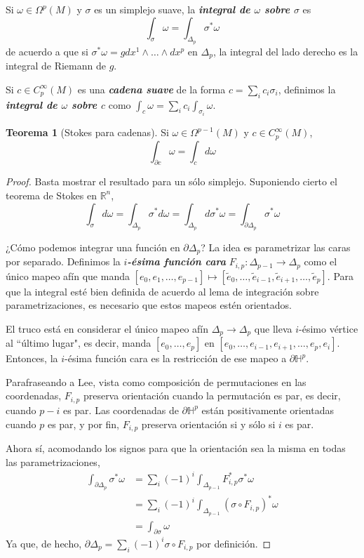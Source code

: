 \documentclass[spanish]{article}
\theoremstyle{definition}
\newtheorem*{teo}{Teorema}
\newcommand{\R}{\mathbb{R}}
\begin{document}
	Si $\omega\in\Omega^p(M)$ y $\sigma$ es un simplejo suave, la \textbf{\textit{integral de $\omega$ sobre $\sigma$}} es
	\[\int_\sigma \omega=\int_{\Delta_p}\sigma^*\omega\]
	de acuerdo a que si $\sigma^*\omega=gdx^1\wedge\ldots\wedge dx^p$ en $\Delta_p$, la integral del lado derecho es la integral de Riemann de $g$.
	
	Si $c\in C_p^\infty(M)$ es una \textbf{\textit{cadena suave}} de la forma $c=\sum_ic_i\sigma_i$, definimos la \textbf{\textit{integral de $\omega$ sobre $c$}} como $\int_c\omega=\sum_ic_i\int_{\sigma_i}\omega$.
	
	\begin{teo}[Stokes para cadenas]
		Si $\omega\in\Omega^{p-1}(M)$ y $c\in C^\infty_p(M)$,
		\[\int_{\partial c}\omega=\int_cd\omega\]
	\end{teo}
	\begin{proof}
		Basta mostrar el resultado para un sólo simplejo. Suponiendo cierto el teorema de Stokes en $\R^n$,
		\[\int_{\sigma}d\omega=\int_{\Delta_p}\sigma^*d\omega=\int_{\Delta_p}d\sigma^*\omega=\int_{\partial \Delta_p}\sigma^*\omega\]
		
		¿Cómo podemos integrar una función en $\partial\Delta_p$? La idea es parametrizar las caras por separado. Definimos la \textbf{\textit{$i$-ésima función cara}} $F_{i,p}:\Delta_{p-1}\to\Delta_p$ como el único mapeo afín que manda $[e_0,e_1,\ldots,e_{p-1}]\mapsto [\tilde{e}_0,\ldots,\tilde{e}_{i-1},\tilde{e}_{i+1},\ldots,\tilde{e}_p]$. Para que la integral esté bien definida de acuerdo al lema de integración sobre parametrizaciones, es necesario que estos mapeos estén orientados.
		
		El truco está en considerar el único mapeo afín $\Delta_p\to\Delta_p$ que lleva $i$-ésimo vértice al ``último lugar", es decir, manda $[e_0,\ldots,e_p]$ en $[e_0,\ldots,e_{i-1},e_{i+1},\ldots,e_p,e_i]$. Entonces, la $i$-ésima función cara es la restricción de ese mapeo a $\partial\mathbb{H}^p$.
		
		Parafraseando a Lee, vista como composición de permutaciones en las coordenadas, $F_{i,p}$ preserva orientación cuando la permutación es par, es decir, cuando $p-i$ es par. Las coordenadas de $\partial\mathbb{H}^p$ están positivamente orientadas cuando $p$ es par, y por fin, $F_{i,p}$ preserva orientación si y sólo si $i$ es par.
		
		Ahora sí, acomodando los signos para que la orientación sea la misma en todas las parametrizaciones,
		\begin{align*}
			\int_{\partial\Delta_p}\sigma^*\omega&=\sum_i(-1)^i\int_{\Delta_{p-1}}F^*_{i,p}\sigma^*\omega\\
			&=\sum_i(-1)^i\int_{\Delta_{p-1}}(\sigma\circ F_{i,p})^*\omega\\
			&=\int_{\partial\sigma}\omega
		\end{align*}
		Ya que, de hecho, $\partial\Delta_p=\sum_i(-1)^i\sigma\circ F_{i,p}$ por definición.
	\end{proof}
	
\end{document}
